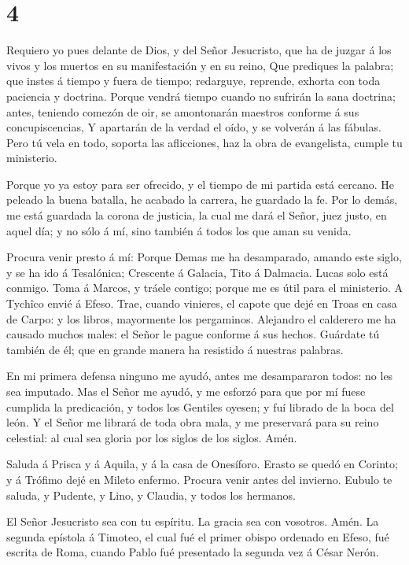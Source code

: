 \hypertarget{section-3}{%
\section{4}\label{section-3}}

 Requiero yo pues delante de Dios, y del Señor Jesucristo,
que ha de juzgar á los vivos y los muertos en su manifestación y en su
reino,  Que prediques la palabra; que instes á tiempo y
fuera de tiempo; redarguye, reprende, exhorta con toda paciencia y
doctrina.  Porque vendrá tiempo cuando no sufrirán la sana
doctrina; antes, teniendo comezón de oir, se amontonarán maestros
conforme á sus concupiscencias,  Y apartarán de la verdad el
oído, y se volverán á las fábulas.  Pero tú vela en todo,
soporta las aflicciones, haz la obra de evangelista, cumple tu
ministerio.

 Porque yo ya estoy para ser ofrecido, y el tiempo de mi
partida está cercano.  He peleado la buena batalla, he
acabado la carrera, he guardado la fe.  Por lo demás, me
está guardada la corona de justicia, la cual me dará el Señor, juez
justo, en aquel día; y no sólo á mí, sino también á todos los que aman
su venida.

 Procura venir presto á mí:  Porque Demas me ha
desamparado, amando este siglo, y se ha ido á Tesalónica; Crescente á
Galacia, Tito á Dalmacia.  Lucas solo está conmigo. Toma á
Marcos, y tráele contigo; porque me es útil para el ministerio.
 A Tychîco envié á Efeso.  Trae, cuando
vinieres, el capote que dejé en Troas en casa de Carpo: y los libros,
mayormente los pergaminos.  Alejandro el calderero me ha
causado muchos males: el Señor le pague conforme á sus hechos.
 Guárdate tú también de él; que en grande manera ha
resistido á nuestras palabras.

 En mi primera defensa ninguno me ayudó, antes me
desampararon todos: no les sea imputado.  Mas el Señor me
ayudó, y me esforzó para que por mí fuese cumplida la predicación, y
todos los Gentiles oyesen; y fuí librado de la boca del león.
 Y el Señor me librará de toda obra mala, y me preservará
para su reino celestial: al cual sea gloria por los siglos de los
siglos. Amén.

 Saluda á Prisca y á Aquila, y á la casa de Onesíforo.
 Erasto se quedó en Corinto; y á Trófimo dejé en Mileto
enfermo.  Procura venir antes del invierno. Eubulo te
saluda, y Pudente, y Lino, y Claudia, y todos los hermanos.

 El Señor Jesucristo sea con tu espíritu. La gracia sea con
vosotros. Amén. La segunda epístola á Timoteo, el cual fué el primer
obispo ordenado en Efeso, fué escrita de Roma, cuando Pablo fué
presentado la segunda vez á César Nerón.

